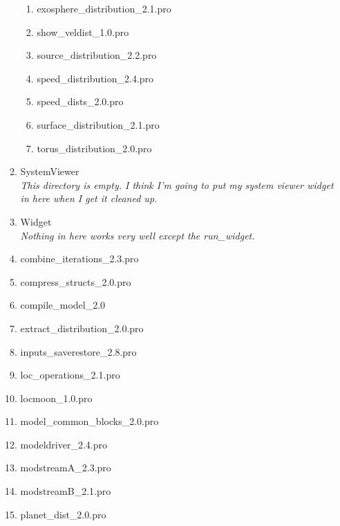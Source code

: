 \documentclass[11pt]{article}
\begin{document}
\begin{enumerate}
\begin{enumerate}
\begin{enumerate}
    \item exosphere\_distribution\_2.1.pro
    \item show\_veldist\_1.0.pro
    \item source\_distribution\_2.2.pro
    \item speed\_distribution\_2.4.pro
    \item speed\_dists\_2.0.pro
    \item surface\_distribution\_2.1.pro
    \item torus\_distribution\_2.0.pro
    \end{enumerate}
  \item {\color{blue}SystemViewer}  \\
    \textit{This directory is empty. I think I'm going to put my system viewer 
    widget in here when I get it cleaned up.}
  \item {\color{blue}Widget} \\
    \textit{Nothing in here works very well except the run\_widget.}
  \item combine\_iterations\_2.3.pro
  \item compress\_structs\_2.0.pro
  \item compile\_model\_2.0
  \item extract\_distribution\_2.0.pro
  \item inputs\_saverestore\_2.8.pro
  \item loc\_operations\_2.1.pro
  \item locmoon\_1.0.pro
  \item model\_common\_blocks\_2.0.pro
  \item modeldriver\_2.4.pro
  \item modstreamA\_2.3.pro
  \item modstreamB\_2.1.pro
  \item planet\_dist\_2.0.pro
  \end{enumerate}


\end{enumerate}
\end{document}
